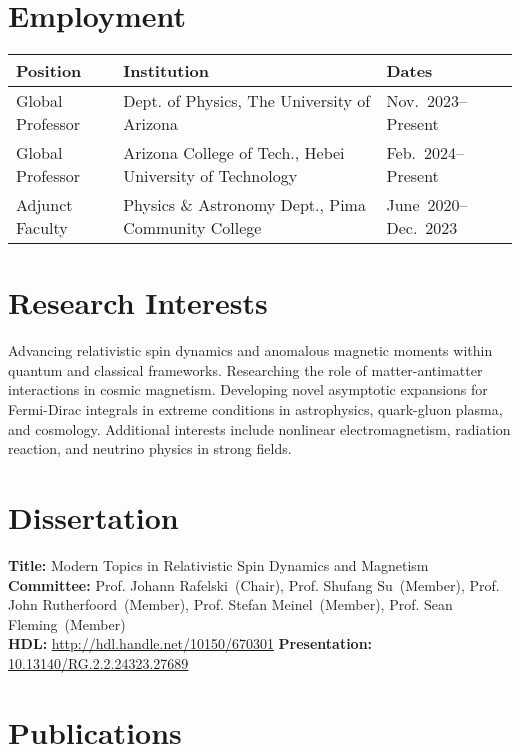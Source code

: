 \documentclass[11pt]{article}
\begin{document}
\section*{Employment}
{\normalsize
\begin{tabular}{@{}p{2.8cm} p{9.5cm} p{3.2cm}@{}}
\toprule
\textbf{Position} & \textbf{Institution} & \textbf{Dates} \\
\midrule
Global Professor   & Dept. of Physics, The University of Arizona            & {\footnotesize Nov.~2023--Present} \\
Global Professor   & Arizona College of Tech., Hebei University of Technology       & {\footnotesize Feb.~2024--Present} \\
Adjunct Faculty    & Physics \& Astronomy Dept., Pima Community College               & {\footnotesize June~2020--Dec.~2023} \\
\bottomrule
\end{tabular}
}

\section*{Research Interests}
Advancing relativistic spin dynamics and anomalous magnetic moments within quantum and classical frameworks. Researching the role of matter-antimatter interactions in cosmic magnetism. Developing novel asymptotic expansions for Fermi-Dirac integrals in extreme conditions in astrophysics, quark-gluon plasma, and cosmology. Additional interests include nonlinear electromagnetism, radiation reaction, and neutrino physics in strong fields. 

\section*{Dissertation}
\textbf{Title:} Modern Topics in Relativistic Spin Dynamics and Magnetism\\[0.3em]
\textbf{Committee:} Prof. Johann Rafelski~(Chair), Prof. Shufang Su~(Member), Prof. John Rutherfoord~(Member), Prof. Stefan Meinel~(Member), Prof. Sean Fleming~(Member)\\[0.3em]
\textbf{HDL:} \href{http://hdl.handle.net/10150/670301}{http://hdl.handle.net/10150/670301} \quad \textbf{Presentation:} \href{http://dx.doi.org/10.13140/RG.2.2.24323.27689}{10.13140/RG.2.2.24323.27689}\\[0.3em]

\newpage

\section*{Publications}
\end{document}
